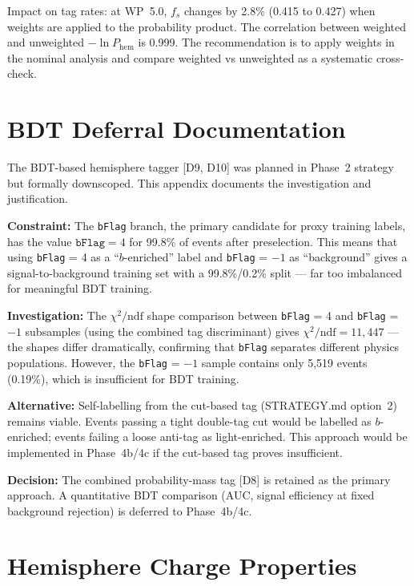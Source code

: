 \documentclass[11pt,a4paper]{article}
\begin{document}
Impact on tag rates: at WP~5.0, $f_s$ changes by 2.8\% (0.415 to 0.427) when weights
are applied to the probability product. The correlation between weighted and unweighted
$-\ln P_\mathrm{hem}$ is 0.999. The recommendation is to apply weights in the nominal
analysis and compare weighted vs unweighted as a systematic cross-check.

\section{BDT Deferral Documentation}
\label{app:bdt_deferral}

The BDT-based hemisphere tagger [D9, D10] was planned in Phase~2 strategy but formally
downscoped. This appendix documents the investigation and justification.

\textbf{Constraint:} The \texttt{bFlag} branch, the primary candidate for proxy training
labels, has the value $\texttt{bFlag} = 4$ for 99.8\% of events after preselection. This
means that using \texttt{bFlag} = 4 as a ``$b$-enriched'' label and \texttt{bFlag} = $-1$
as ``background'' gives a signal-to-background training set with a 99.8\%/0.2\% split ---
far too imbalanced for meaningful BDT training.

\textbf{Investigation:} The $\chi^2/\mathrm{ndf}$ shape comparison between
\texttt{bFlag} = 4 and \texttt{bFlag} = $-1$ subsamples (using the combined tag
discriminant) gives $\chi^2/\mathrm{ndf} = 11{,}447$ --- the shapes differ dramatically,
confirming that \texttt{bFlag} separates different physics populations. However, the
\texttt{bFlag} = $-1$ sample contains only 5,519 events (0.19\%), which is insufficient
for BDT training.

\textbf{Alternative:} Self-labelling from the cut-based tag (STRATEGY.md option~2)
remains viable. Events passing a tight double-tag cut would be labelled as $b$-enriched;
events failing a loose anti-tag as light-enriched. This approach would be implemented in
Phase~4b/4c if the cut-based tag proves insufficient.

\textbf{Decision:} The combined probability-mass tag [D8] is retained as the primary
approach. A quantitative BDT comparison (AUC, signal efficiency at fixed background
rejection) is deferred to Phase~4b/4c.

\section{Hemisphere Charge Properties}
\label{app:hemisphere_charge}
\label{sec:jetcharge}
\end{document}
